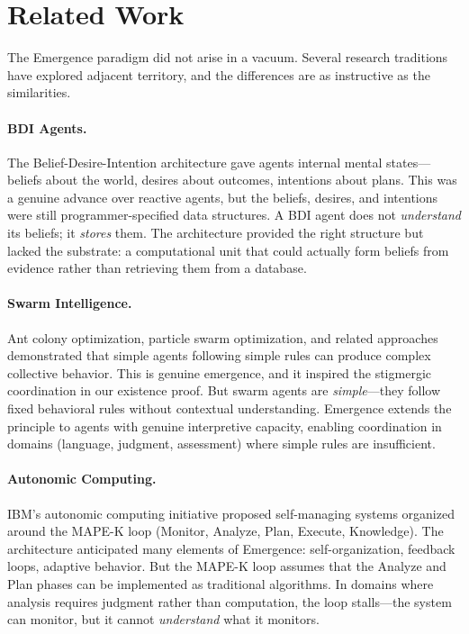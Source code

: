\documentclass[11pt,twocolumn]{article}
\begin{document}
\section{Related Work}
\label{sec:related}

The Emergence paradigm did not arise in a vacuum.  Several research
traditions have explored adjacent territory, and the differences are as
instructive as the similarities.

\paragraph{BDI Agents.}  The Belief-Desire-Intention architecture
\citep{rao1995bdi} gave agents internal mental states---beliefs about
the world, desires about outcomes, intentions about plans.  This was a
genuine advance over reactive agents, but the beliefs, desires, and
intentions were still programmer-specified data structures.  A BDI agent
does not \emph{understand} its beliefs; it \emph{stores} them.  The
architecture provided the right structure but lacked the substrate: a
computational unit that could actually form beliefs from evidence rather
than retrieving them from a database.

\paragraph{Swarm Intelligence.}  Ant colony optimization, particle
swarm optimization, and related approaches
\citep{bonabeau1999swarm} demonstrated that simple agents following
simple rules can produce complex collective behavior.  This is genuine
emergence, and it inspired the stigmergic coordination in our
existence proof.  But swarm agents are \emph{simple}---they follow
fixed behavioral rules without contextual understanding.  Emergence
extends the principle to agents with genuine interpretive capacity,
enabling coordination in domains (language, judgment, assessment) where
simple rules are insufficient.

\paragraph{Autonomic Computing.}  IBM's autonomic computing initiative
\citep{kephart2003vision} proposed self-managing systems organized
around the MAPE-K loop (Monitor, Analyze, Plan, Execute, Knowledge).
The architecture anticipated many elements of Emergence: self-organization,
feedback loops, adaptive behavior.  But the MAPE-K loop assumes that
the Analyze and Plan phases can be implemented as traditional
algorithms.  In domains where analysis requires judgment rather than
computation, the loop stalls---the system can monitor, but it cannot
\emph{understand} what it monitors.
\end{document}
